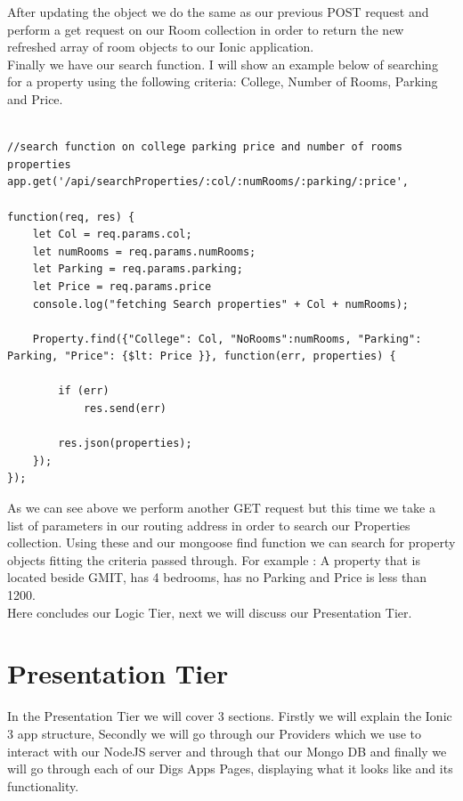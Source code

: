 After updating the object we do the same as our previous POST request and perform a get request on our Room collection in order to return the new refreshed array of room objects to our Ionic application.\\


Finally we have our search function. I will show an example below of searching for a property using the following criteria: College, Number of Rooms, Parking and Price.\\


\begin{verbatim}

//search function on college parking price and number of rooms properties
app.get('/api/searchProperties/:col/:numRooms/:parking/:price', 

function(req, res) {
	let Col = req.params.col;
	let numRooms = req.params.numRooms;
	let Parking = req.params.parking;
	let Price = req.params.price
	console.log("fetching Search properties" + Col + numRooms);

	Property.find({"College": Col, "NoRooms":numRooms, "Parking": Parking, "Price": {$lt: Price }}, function(err, properties) {

		if (err)
			res.send(err)

		res.json(properties); 
	});
});

\end{verbatim}


As we can see above we perform another GET request but this time we take a list of parameters in our routing address in order to search our Properties collection. Using these and our mongoose find function we can search for property objects fitting the criteria passed through. For example : A property that is located beside GMIT, has 4 bedrooms, has no Parking and Price is less than 1200.\\

Here concludes our Logic Tier, next we will discuss our Presentation Tier.

\section{Presentation Tier}

In the Presentation Tier we will cover 3 sections. Firstly we will explain the Ionic 3 app structure, Secondly we will go through our Providers which we use to interact with our NodeJS server and through that our Mongo DB and finally we will go through each of our Digs Apps Pages, displaying what it looks like and its functionality.\\

